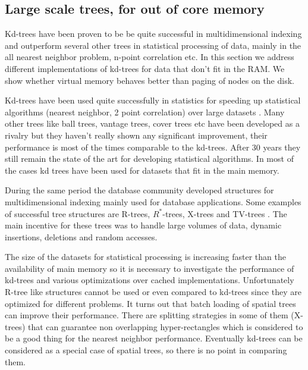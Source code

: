 \documentclass[12pt,letterpaper,doublespaced,ETD,dvips,proposal]{gtthesis}
\begin{document}
\begin{Body}

\subsection{Large scale trees, for out of core memory}
\label{Large_scale_trees}

Kd-trees have been proven to be be quite successful in
multidimensional indexing and outperform several other
trees in statistical processing of data, mainly in the all nearest
neighbor problem, n-point correlation etc. In this section we
address different implementations of kd-trees for data that don't
fit in the RAM. We show whether virtual memory behaves better   than
paging of nodes on the disk.

Kd-trees have been used quite successfully in statistics for
speeding up statistical algorithms (nearest neighbor, 2 point
correlation) over large datasets \cite{gray2000nbp}. Many other trees like ball trees,
vantage trees, cover trees etc \cite{samet2005fma} have been developed as a rivalry but
they haven't really shown any significant improvement, their
performance is most of the times comparable to the kd-trees. After
30 years they still remain the state of the art for developing
statistical algorithms. In most of the cases kd trees have been used
for datasets that fit in the main memory.

During the same period the database community developed structures
for multidimensional indexing mainly used for database applications.
Some examples of successful tree structures are R-trees,
$R^{*}$-trees, X-trees and TV-trees \cite{samet2005fma}. The main incentive for these
trees was to handle large volumes of data, dynamic insertions,
deletions and random accesses.

The size of the datasets for statistical processing is increasing
faster than the availability of  main memory so it is necessary to
investigate the performance of kd-trees and various optimizations
over cached implementations. Unfortunately R-tree like structures
cannot be used or even compared to kd-trees since they are optimized
for different problems. It turns out that batch loading of spatial
trees can improve their performance. There are splitting strategies
in some of them (X-trees) that can guarantee non overlapping
hyper-rectangles which is considered to be a good thing for the
nearest neighbor performance. Eventually kd-trees can be considered
as a special case of spatial trees, so there is no point in
comparing them.


\end{Body}
\end{document}
